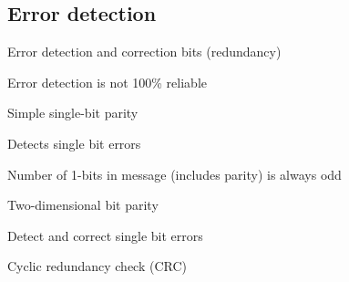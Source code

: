 \subsection{Error detection}
\enumstart
	\item Error detection and correction bits (redundancy)
	\item Error detection is not 100\% reliable
	\item Simple single-bit parity
	\enumstart
		\item Detects single bit errors
		\item Number of 1-bits in message (includes parity) is always odd
	\enumend
	\item Two-dimensional bit parity
	\\ 
	\enumstart
		\item Detect and correct single bit errors
	\enumend
	\item Cyclic redundancy check (CRC)
\enumend

